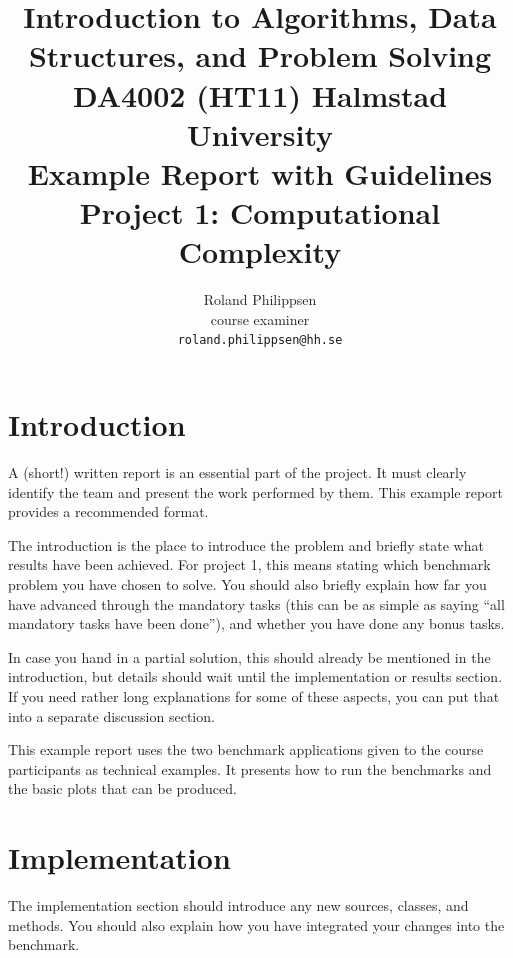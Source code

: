 \documentclass[a4paper,10pt]{article}
\begin{document}
\title{
  {\normalsize
    Introduction to Algorithms, Data Structures, and Problem Solving\\
    DA4002 (HT11) Halmstad University}\\
  Example Report with Guidelines\\
  Project 1: Computational Complexity
}
\author{
  Roland Philippsen\\
  course examiner\\
  \texttt{roland.philippsen@hh.se}
}
\maketitle



\section{Introduction}

A (short!) written report is an essential part of the project.
It must clearly identify the team and present the work performed by them.
This example report provides a recommended format.

The introduction is the place to introduce the problem and briefly state what results have been achieved.
For project 1, this means stating which benchmark problem you have chosen to solve.
You should also briefly explain how far you have advanced through the mandatory tasks (this can be as simple as saying ``all mandatory tasks have been done''),
and whether you have done any bonus tasks.

In case you hand in a partial solution, this should already be mentioned in the introduction, but details should wait until the implementation or results section.
If you need rather long explanations for some of these aspects, you can put that into a separate discussion section.

This example report uses the two benchmark applications given to the course participants as technical examples.
It presents how to run the benchmarks and the basic plots that can be produced.



\section{Implementation}

The implementation section should introduce any new sources, classes, and methods.
You should also explain how you have integrated your changes into the benchmark.
\end{document}
